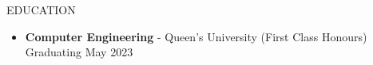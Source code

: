 \documentclass{resume} %
\begin{document}
\begin{rSection}{EDUCATION}
    \begin{itemize}
        \item {\bf Computer Engineering} - Queen's University (First Class Honours) \hfill {Graduating May 2023}
    \end{itemize}
\end{rSection}
\end{document}
